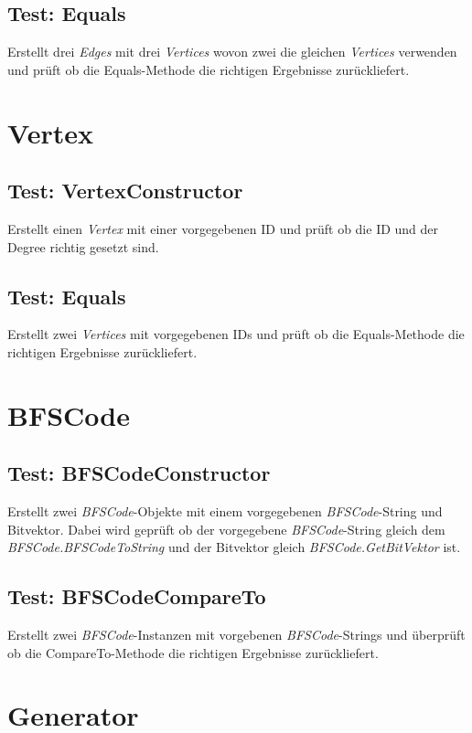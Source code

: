 \documentclass[13pt]{scrreprt}
\begin{document}
\subsection{Test: Equals}
Erstellt drei \textit{Edges} mit drei \textit{Vertices} wovon zwei die gleichen \textit{Vertices} verwenden und prüft ob die Equals-Methode die richtigen Ergebnisse zurückliefert.

\newpage
\section{Vertex}

\subsection{Test: VertexConstructor}
Erstellt einen \textit{Vertex} mit einer vorgegebenen ID und prüft ob die ID und der Degree richtig gesetzt sind.

\subsection{Test: Equals}
Erstellt zwei \textit{Vertices} mit vorgegebenen IDs und prüft ob die Equals-Methode die richtigen Ergebnisse zurückliefert.

\section{BFSCode}

\subsection{Test: BFSCodeConstructor}
Erstellt zwei \textit{BFSCode}-Objekte mit einem vorgegebenen \textit{BFSCode}-String und Bitvektor. Dabei wird geprüft ob der vorgegebene \textit{BFSCode}-String gleich dem \textit{BFSCode.BFSCodeToString} und der Bitvektor gleich \textit{BFSCode.GetBitVektor} ist.

\subsection{Test: BFSCodeCompareTo}
Erstellt zwei \textit{BFSCode}-Instanzen mit vorgebenen \textit{BFSCode}-Strings und überprüft ob die CompareTo-Methode die richtigen Ergebnisse zurückliefert.
\newpage
\section{Generator}
\end{document}
